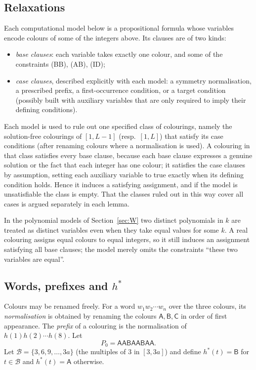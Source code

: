 \documentclass[11pt]{amsart}
\theoremstyle{definition}
\theoremstyle{remark}
\newcommand{\cA}{\mathsf{A}}\newcommand{\cB}{\mathsf{B}}\newcommand{\cC}{\mathsf{C}}
\newcommand{\Pz}{P_0}
\newcommand{\Bset}{\mathcal B}
\begin{document}
\subsection{Relaxations}\label{sec:relax}
Each computational model below is a propositional formula whose variables encode colours of some of the integers
above. Its clauses are of two kinds:
\begin{itemize}
\item \emph{base clauses}: each variable takes exactly one colour, and some of the constraints (BB), (AB), (ID);
\item \emph{case clauses}, described explicitly with each model: a symmetry normalisation, a prescribed prefix, a
first-occurrence condition, or a target condition (possibly built with auxiliary variables that are only required to
imply their defining conditions).
\end{itemize}
Each model is used to rule out one specified class of colourings, namely the solution-free colourings of $[1,L-1]$
(resp.\ $[1,L]$) that satisfy its case conditions (after renaming colours where a normalisation is used). A
colouring in that class satisfies every base clause, because each base clause expresses a genuine solution or the
fact that each integer has one colour; it satisfies the case clauses by assumption, setting each auxiliary
variable to true exactly when its defining condition holds. Hence it induces a satisfying assignment, and if the
model is unsatisfiable the class is empty. That the classes ruled out in this way cover all cases is argued
separately in each lemma.

In the polynomial models of Section~\ref{sec:W} two distinct polynomials in $k$ are treated as distinct variables
even when they take equal values for some $k$. A real colouring assigns equal colours to equal integers, so it still
induces an assignment satisfying all base clauses; the model merely omits the constraints ``these two variables are
equal''.

\subsection{Words, prefixes and $h^\ast$}
Colours may be renamed freely. For a word $w_1w_2\cdots w_n$ over the three colours, its \emph{normalisation} is
obtained by renaming the colours $\cA,\cB,\cC$ in order of first appearance. The \emph{prefix} of a colouring is the
normalisation of $h(1)h(2)\cdots h(8)$. Let
\[\Pz=\cA\cA\cB\cA\cA\cB\cA\cA .\]
Let $\Bset=\{3,6,9,\dots,3a\}$ (the multiples of $3$ in $[3,3a]$) and define $h^\ast(t)=\cB$ for $t\in\Bset$ and
$h^\ast(t)=\cA$ otherwise.
\end{document}
